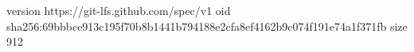 version https://git-lfs.github.com/spec/v1
oid sha256:69bbbce913c195f70b8b1441b794188e2cfa8ef4162b9c074f191e74a1f371fb
size 912
